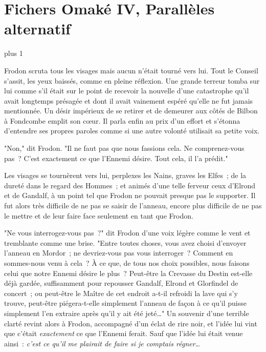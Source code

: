 
\makeatletter
\newcommand{\OmakeIVspecialsection}[2][1.5]{%
\vspace*{2\baselineskip plus 1\baselineskip minus 1\baselineskip}%
\noindent\hfill\scalebox{#1}{#2}\hfill\mbox{}%
\vskip 1\baselineskip plus 1\baselineskip%
\@afterindentfalse\@afterheading
}
\makeatother

\newcommand{\OmakeIVsection}[2][1.5]{%
  \OmakeIVspecialsection[#1]{\MakeUppercase{#2}}}

\chapter{Fichers Omaké IV, Parallèles alternatif}

\OmakeIVspecialsection[1.6]{\fontspec[ExternalLocation]{RingBearer}
\settowidth{\versewidth}{\mbox{Le}}
Seigneur\scalebox{.40}{\parbox[b]{\versewidth}{%
        \centering de\\\nointerlineskip\vskip 4pt la}}Rationalit\raisebox{-.32ex}{É}}

Frodon scruta tous les visages mais aucun n'était tourné vers lui. Tout le Conseil s'assit, les yeux baissés, comme en pleine réflexion. Une grande terreur tomba sur lui comme s'il était sur le point de recevoir la nouvelle d'une catastrophe qu'il avait longtemps présagée et dont il avait vainement espéré qu'elle ne fut jamais mentionnée. Un désir impérieux de se retirer et de demeurer aux côtés de Bilbon à Fondcombe emplit son cœur. Il parla enfin au prix d'un effort et s'étonna d'entendre ses propres paroles comme si une autre volonté utilisait sa petite voix.

"Non," dit Frodon. "Il ne faut pas que nous fassions cela. Ne comprenez-vous pas~? C'est exactement ce que l'Ennemi désire. Tout cela, il l'a prédit."

Les visages se tournèrent vers lui, perplexes les Nains, graves les Elfes~; de la dureté dans le regard des Hommes~; et animés d'une telle ferveur ceux d'Elrond et de Gandalf, à un point tel que Frodon ne pouvait presque pas le supporter. Il fut alors très difficile de ne pas se saisir de l'anneau, encore plus difficile de ne pas le mettre et de leur faire face seulement en tant que Frodon.

"Ne vous interrogez-vous pas~?" dit Frodon d'une voix légère comme le vent et tremblante comme une brise. "Entre toutes choses, vous avez choisi d'envoyer l'anneau en Mordor~; ne devriez-vous pas vous interroger~? Comment en sommes-nous venu à cela~? À ce que, de tous nos choix possibles, nous faisons celui que notre Ennemi désire le plus~? Peut-être la Crevasse du Destin est-elle déjà gardée, suffisamment pour repousser Gandalf, Elrond et Glorfindel de concert~; ou peut-être le Maître de cet endroit a-t-il refroidi la lave qui s'y trouve, peut-être piégera-t-elle simplement l'anneau de façon à ce qu'il puisse simplement l'en extraire après qu'il y ait été jeté…" Un souvenir d'une terrible clarté revint alors à Frodon, accompagné d'un éclat de rire noir, et l'idée lui vint que c'était \emph{exactement} ce que l'Ennemi ferait. Sauf que l'idée lui était venue ainsi~: \emph{c'est ce qu'il me plairait de faire si je comptais régner…}

